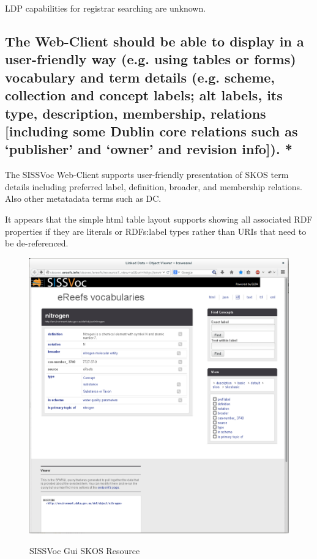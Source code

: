 \documentclass[10pt,a4paper]{article}
\begin{document}
\begin{flushleft}
LDP capabilities for registrar searching are unknown.


\subsection{ The Web-Client should be able to display in a user-friendly way
(e.g. using tables or forms) vocabulary and term details (e.g. scheme,
collection and concept labels; alt labels, its type, description, membership,
relations [including some Dublin core relations such as ‘publisher’ and ‘owner’
and revision info]). * }

\item The SISSVoc Web-Client supports user-friendly presentation of SKOS term details
including preferred label, definition, broader, and membership relations. Also
other metatadata terms such as DC. 

\item It appears that the simple html table layout supports showing all associated RDF
properties if they are literals or RDFs:label types rather than URIs that
need to be de-referenced.

\begin{figure}[H]
\centering
\caption{SISSVoc Gui SKOS Resource }
\includegraphics[width=12cm]{nitrogen}  
\label{fig:test}
\end{figure}



\end{flushleft}
\end{document}
